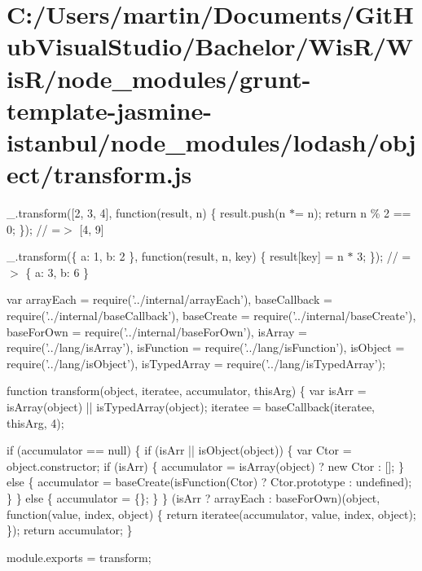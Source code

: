 \hypertarget{_c_1_2_users_2martin_2_documents_2_git_hub_visual_studio_2_bachelor_2_wis_r_2_wis_r_2node_module6d4a7bcdf10b974f4473d4135ecffd40}{}\section{C\+:/\+Users/martin/\+Documents/\+Git\+Hub\+Visual\+Studio/\+Bachelor/\+Wis\+R/\+Wis\+R/node\+\_\+modules/grunt-\/template-\/jasmine-\/istanbul/node\+\_\+modules/lodash/object/transform.\+js}
\+\_\+.\+transform(\mbox{[}2, 3, 4\mbox{]}, function(result, n) \{ result.\+push(n $\ast$= n); return n \% 2 == 0; \}); // =$>$ \mbox{[}4, 9\mbox{]}

\+\_\+.\+transform(\{ \textquotesingle{}a\textquotesingle{}\+: 1, \textquotesingle{}b\textquotesingle{}\+: 2 \}, function(result, n, key) \{ result\mbox{[}key\mbox{]} = n $\ast$ 3; \}); // =$>$ \{ \textquotesingle{}a\textquotesingle{}\+: 3, \textquotesingle{}b\textquotesingle{}\+: 6 \}


\begin{DoxyCodeInclude}
var arrayEach = require(\textcolor{stringliteral}{'../internal/arrayEach'}),
    baseCallback = require(\textcolor{stringliteral}{'../internal/baseCallback'}),
    baseCreate = require(\textcolor{stringliteral}{'../internal/baseCreate'}),
    baseForOwn = require(\textcolor{stringliteral}{'../internal/baseForOwn'}),
    isArray = require(\textcolor{stringliteral}{'../lang/isArray'}),
    isFunction = require(\textcolor{stringliteral}{'../lang/isFunction'}),
    isObject = require(\textcolor{stringliteral}{'../lang/isObject'}),
    isTypedArray = require(\textcolor{stringliteral}{'../lang/isTypedArray'});

\textcolor{keyword}{function} transform(\textcolor{keywordtype}{object}, iteratee, accumulator, thisArg) \{
  var isArr = isArray(\textcolor{keywordtype}{object}) || isTypedArray(\textcolor{keywordtype}{object});
  iteratee = baseCallback(iteratee, thisArg, 4);

  \textcolor{keywordflow}{if} (accumulator == null) \{
    \textcolor{keywordflow}{if} (isArr || isObject(\textcolor{keywordtype}{object})) \{
      var Ctor = \textcolor{keywordtype}{object}.constructor;
      \textcolor{keywordflow}{if} (isArr) \{
        accumulator = isArray(\textcolor{keywordtype}{object}) ? \textcolor{keyword}{new} Ctor : [];
      \} \textcolor{keywordflow}{else} \{
        accumulator = baseCreate(isFunction(Ctor) ? Ctor.prototype : undefined);
      \}
    \} \textcolor{keywordflow}{else} \{
      accumulator = \{\};
    \}
  \}
  (isArr ? arrayEach : baseForOwn)(\textcolor{keywordtype}{object}, \textcolor{keyword}{function}(value, index, \textcolor{keywordtype}{object}) \{
    \textcolor{keywordflow}{return} iteratee(accumulator, value, index, \textcolor{keywordtype}{object});
  \});
  \textcolor{keywordflow}{return} accumulator;
\}

module.exports = transform;
\end{DoxyCodeInclude}
 